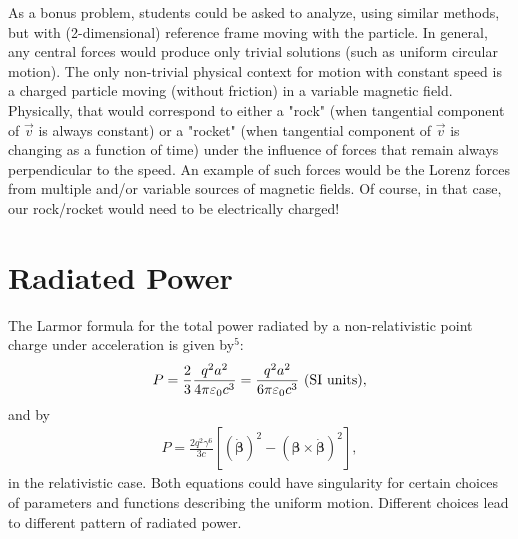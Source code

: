 \documentclass[journal]{IEEEtran}
\begin{document}
\par As a bonus problem, students could be asked to analyze, using similar methods, but with (2-dimensional) reference frame moving with the particle. In general, any central forces would produce only trivial solutions (such as uniform circular motion). The only non-trivial physical context for motion with constant speed is a charged particle moving (without friction) in a variable magnetic field.  Physically, that would correspond to either a "rock" (when tangential component of $\vec{v}$ is always constant) or a "rocket" (when tangential component of $\vec{v}$ is changing as a function of time) under the influence of forces that remain always perpendicular to the speed.  An example of such forces would be the Lorenz forces from multiple and/or variable sources of magnetic fields.  Of course, in that case, our rock/rocket would need to be electrically charged!


\section{\bf\large Radiated Power}
The Larmor formula for the total power radiated by a non-relativistic point charge under acceleration is given by$^5$:
\begin{align}
P={2 \over 3}{\frac {q^{2}a^{2}}{4\pi \varepsilon _{0}c^{3}}}={\frac {q^{2}a^{2}}{6\pi \varepsilon _{0}c^{3}}}{\mbox{ (SI units)}} ,
\end{align}
and by 
\begin{align}
P={\frac {2q^{2}\gamma ^{6}}{3c}}\left[({\dot {\boldsymbol {\beta }}})^{2}-({\boldsymbol {\beta }}\times {\dot {\boldsymbol {\beta }}})^{2}\right] ,
\end{align}
in the relativistic case.  Both equations could have singularity for certain choices of parameters and functions describing the uniform motion.  Different choices lead to different pattern of radiated power.  
\end{document}
